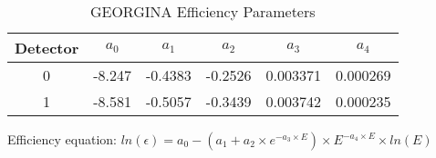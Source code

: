 \begin{table}[]
    \centering
    \caption{GEORGINA Efficiency Parameters}
    \label{tab:georgina_eff}
    \begin{threeparttable}
    \begin{tabular}{c|c|c|c|c|c}
        \toprule
        Detector & $a_0$ & $a_1$ & $a_2$ & $a_3$ & $a_4$ \\
        \hline
        0 & -8.247 & -0.4383 & -0.2526 & 0.003371 & 0.000269  \\
        1 & -8.581 & -0.5057 & -0.3439 & 0.003742 & 0.000235 \\
        \bottomrule
    \end{tabular}
    \begin{tablenotes}[para]
        Efficiency equation: $ln(\epsilon) = a_0-(a_1+a_2\times e^{-a_3\times E})\times E^{-a_4\times E}\times ln(E)$
    \end{tablenotes}
\end{threeparttable}
\end{table}